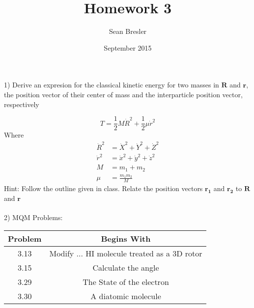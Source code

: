 \documentclass[12pt,twoside,a4paper]{article}
\begin{document}
\title{Homework 3}
\author{Sean Bresler}
\date{September 2015}
\maketitle{}	

1) Derive an expresion for the classical kinetic energy for two masses in $\boldsymbol{R}$ and $\boldsymbol{r}$, the position vector of their center of mass and the interparticle position vector, respectively

	\begin{equation}
		T = \frac{1}{2}M\dot{R}^2
			+\frac{1}{2}\mu\dot{r}^2
	\end{equation}
Where 
	\begin{align*}
		\dot{R}^2 &= \dot{X}^2 + \dot{Y}^2 + \dot{Z}^2 \\
		\dot{r}^2 &= \dot{x}^2 + \dot{y}^2 + \dot{z}^2 \\
		M &= m_1+m_2 \\
		\mu &= \frac{m_1m_2}{M}
	\end{align*}
Hint: Follow the outline given in class. Relate the position vectors $\boldsymbol{r_1}$ and $\boldsymbol{r_2}$ to $\boldsymbol{R}$ and $\boldsymbol{r}$
\\
\\

2) MQM Problems:
\begin{center}
	\begin{tabular}{|c|c|}
		\hline Problem  & Begins With  \\ 
		\hline  3.13 & Modify ... HI molecule treated as a 3D rotor  \\ 
		\hline  3.15 & Calculate the angle  \\ 
		\hline  3.29 & The State of the electron \\ 
		\hline  3.30 & A diatomic molecule \\ 
		\hline 
	\end{tabular} 
\end{center}



	
\end{document}
